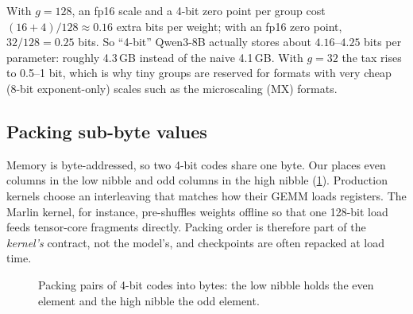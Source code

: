 \begin{napkinmath}
With $g=128$, an fp16 scale and a 4-bit zero point per group cost $(16+4)/128\approx0.16$
extra bits per weight; with an fp16 zero point, $32/128=0.25$ bits. So ``4-bit'' Qwen3-8B
actually stores about $4.16$--$4.25$ bits per parameter: roughly 4.3\,GB instead of the
naive 4.1\,GB. With $g=32$ the tax rises to 0.5--1 bit, which is why tiny groups are
reserved for formats with very cheap (8-bit exponent-only) scales such as the
microscaling (MX) formats.
\end{napkinmath}

\subsection{Packing sub-byte values}
Memory is byte-addressed, so two 4-bit codes share one byte. Our 
places even columns in the low nibble and odd columns in the high nibble
(\cref{fig:efficient:pack}). Production kernels choose an interleaving that matches how
their GEMM loads registers. The Marlin kernel, for instance, pre-shuffles weights
offline so that one 128-bit load feeds tensor-core fragments directly. Packing order is
therefore part of the \emph{kernel's} contract, not the model's, and checkpoints are
often repacked at load time.

\begin{figure}[t]
\centering
{}
\caption{Packing pairs of 4-bit codes into bytes: the low nibble holds the even
element and the high nibble the odd element.}
\label{fig:efficient:pack}
\end{figure}

